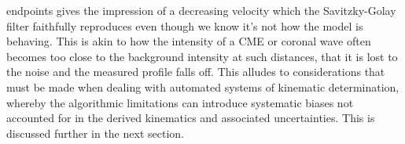 \documentclass[structabstract]{aa}
\begin{document}
endpoints gives the impression of a decreasing velocity which the Savitzky-Golay filter faithfully reproduces even though we know it's not how the model is behaving. This is akin to how the intensity of a CME or coronal wave often becomes too close to the background intensity at such distances, that it is lost to the noise and the measured profile falls off. This alludes to considerations that must be made when dealing with automated systems of kinematic determination, whereby the algorithmic limitations can introduce systematic biases not accounted for in the derived kinematics and associated uncertainties. This is discussed further in the next section.


\begin{figure}[t]
\centering
{}

\end{figure}
\end{document}

